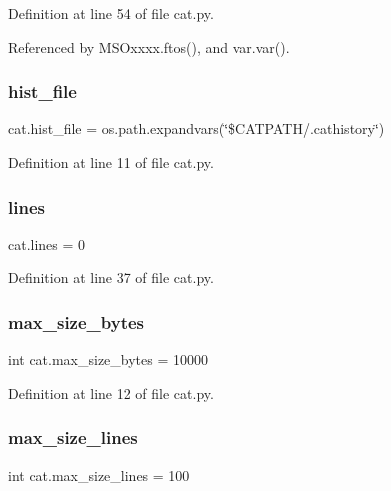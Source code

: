 Definition at line 54 of file cat.\+py.



Referenced by M\+S\+Oxxxx.\+ftos(), and var.\+var().

\mbox{\label{namespacecat_a5be1540f4d9418c1650b9bafbe8efa5a}} 
\subsubsection{\texorpdfstring{hist\+\_\+file}{hist\_file}}
{\footnotesize\ttfamily cat.\+hist\+\_\+file = os.\+path.\+expandvars(\char`\"{}\$C\+A\+T\+P\+A\+TH/.cathistory\char`\"{})}



Definition at line 11 of file cat.\+py.

\mbox{\label{namespacecat_a0a8f4dfbf66e37f285191b2b6c7e2e0f}} 
\subsubsection{\texorpdfstring{lines}{lines}}
{\footnotesize\ttfamily cat.\+lines = 0}



Definition at line 37 of file cat.\+py.

\mbox{\label{namespacecat_ad56fd90da4261a3734b29a9a5e2d9a4e}} 
\subsubsection{\texorpdfstring{max\+\_\+size\+\_\+bytes}{max\_size\_bytes}}
{\footnotesize\ttfamily int cat.\+max\+\_\+size\+\_\+bytes = 10000}



Definition at line 12 of file cat.\+py.

\mbox{\label{namespacecat_a8e9446761b014effec3f2ec3748ae6c4}} 
\subsubsection{\texorpdfstring{max\+\_\+size\+\_\+lines}{max\_size\_lines}}
{\footnotesize\ttfamily int cat.\+max\+\_\+size\+\_\+lines = 100}



